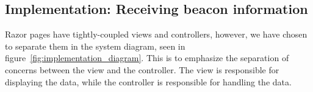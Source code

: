 \subsection{Implementation: Receiving beacon information}\label{sec:ble_implementation}
Razor pages have tightly-coupled views and controllers, however, we have chosen to separate them in the system diagram, seen in figure~\ref{fig:implementation_diagram}. This is to emphasize the separation of concerns between the view and the controller. The view is responsible for displaying the data, while the controller is responsible for handling the data.












